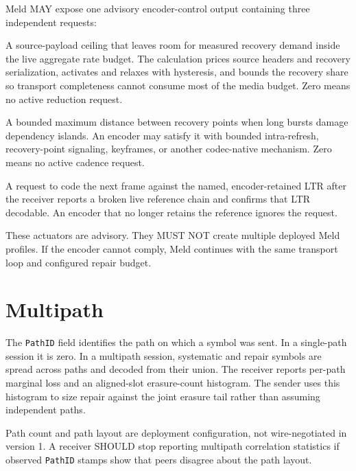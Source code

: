 \documentclass[11pt]{article}
\newcommand{\meld}{Meld}
\newcommand{\wireversion}{1}
\newcommand{\code}[1]{\ifmmode\text{\texttt{#1}}\else\texttt{#1}\fi}
\newcommand{\field}[1]{\code{#1}}
\begin{document}
\meld{} MAY expose one advisory encoder-control output containing three independent
requests:

\begin{description}[leftmargin=3.5cm,style=nextline]
\item[\field{TargetBitrateBps}]
  A source-payload ceiling that leaves room for measured recovery demand inside
  the live aggregate rate budget. The calculation prices source headers and
  recovery serialization, activates and relaxes with hysteresis, and bounds the
  recovery share so transport completeness cannot consume most of the media
  budget. Zero means no active reduction request.
\item[\field{RecoveryCadenceFrames}]
  A bounded maximum distance between recovery points when long bursts damage
  dependency islands. An encoder may satisfy it with bounded intra-refresh,
  recovery-point signaling, keyframes, or another codec-native mechanism. Zero
  means no active cadence request.
\item[\field{Resync}, \field{ResyncRefFrameID}]
  A request to code the next frame against the named, encoder-retained LTR after
  the receiver reports a broken live reference chain and confirms that LTR
  decodable. An encoder that no longer retains the reference ignores the request.
\end{description}

These actuators are advisory. They MUST NOT create multiple deployed Meld
profiles. If the encoder cannot comply, Meld continues with the same transport
loop and configured repair budget.

\section{Multipath}

The \field{PathID} field identifies the path on which a symbol was sent. In a
single-path session it is zero. In a multipath session, systematic and repair
symbols are spread across paths and decoded from their union. The receiver reports
per-path marginal loss and an aligned-slot erasure-count histogram. The sender
uses this histogram to size repair against the joint erasure tail rather than
assuming independent paths.

Path count and path layout are deployment configuration, not wire-negotiated in
version \wireversion. A receiver SHOULD stop reporting multipath correlation
statistics if observed \field{PathID} stamps show that peers disagree about the
path layout.
\end{document}
